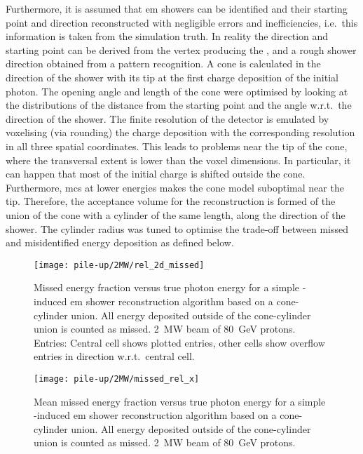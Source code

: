 Furthermore, it is assumed that \gls{em} showers can be identified and their starting point and direction reconstructed with negligible errors and inefficiencies, i.e.\ this information is taken from the simulation truth.
In reality the direction and starting point can be derived from the vertex producing the \Pgpz, and a rough shower direction obtained from a pattern recognition.
A cone is calculated in the direction of the shower with its tip at the first charge deposition of the initial photon.
The opening angle and length of the cone were optimised by looking at the distributions of the distance from the starting point and the angle w.r.t.\ the direction of the shower.
The finite resolution of the detector is emulated by voxelising (via rounding) the charge deposition with the corresponding resolution in all three spatial coordinates.
This leads to problems near the tip of the cone, where the transversal extent is lower than the voxel dimensions.
In particular, it can happen that most of the initial charge is shifted outside the cone.
Furthermore, \gls{mcs} at lower energies makes the cone model suboptimal near the tip.
Therefore, the acceptance volume for the reconstruction is formed of the union of the cone with a cylinder of the same length, along the direction of the shower.
The cylinder radius was tuned to optimise the trade-off between missed and misidentified energy deposition as defined below.

\begin{figure}[htb]
	\centering
	\texttt{[image: pile-up/2MW/rel\_2d\_missed]}
	\caption[Pile-up study missed fractional vs.\ true photon energy, \SI{2}{\mega\watt} beam]{%
		Missed energy fraction versus true photon energy for a simple \Pgpz-induced \acrshort{em} shower reconstruction algorithm based on a cone-cylinder union.
		All energy deposited outside of the cone-cylinder union is counted as missed.
		\SI{2}{\mega\watt} beam of \SI{80}{\giga\electronvolt} protons.
		Entries: Central cell shows plotted entries, other cells show overflow entries in direction w.r.t.\ central cell.
	}
	\label{fig:dune-nd_2MW_rel-2d-missed}
\end{figure}

\begin{figure}[htb]
	\centering
	\texttt{[image: pile-up/2MW/missed\_rel\_x]}
	\caption[Pile-up study mean missed fractional vs.\ true photon energy, \SI{2}{\mega\watt} beam]{%
		Mean missed energy fraction versus true photon energy for a simple \Pgpz-induced \acrshort{em} shower reconstruction algorithm based on a cone-cylinder union.
		All energy deposited outside of the cone-cylinder union is counted as missed.
		\SI{2}{\mega\watt} beam of \SI{80}{\giga\electronvolt} protons.
	}
	\label{fig:dune-nd_2MW_missed-rel-x}
\end{figure}

